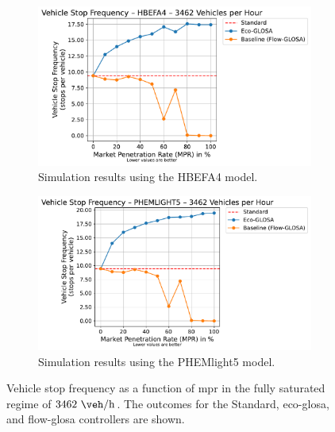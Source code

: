 \begin{figure}[htbp]
  \centering
  \begin{subfigure}[b]{0.98\textwidth}
    \includegraphics[width=\textwidth]{data/img/VehicleStopFrequency/VehicleStopFrequency_HBEFA4_Cars3462.pdf}
    \caption{Simulation results using the HBEFA4 model.}
    \label{fig:StopFreq_3462_HBEFA4}
  \end{subfigure}
  \begin{subfigure}[b]{0.98\textwidth}
    \includegraphics[width=\textwidth]{data/img/VehicleStopFrequency/VehicleStopFrequency_PHEMLIGHT5_Cars3462.pdf}
    \caption{Simulation results using the PHEMlight5 model.}
    \label{fig:StopFreq_3462_PHEM}
  \end{subfigure}
  \caption[Vehicle stop frequency vs. \ac{mpr} at $3462~\unit{\veh\per\hour}$]{Vehicle stop frequency as a function of \ac{mpr} in the fully saturated regime of $3462~\unit{\veh\per\hour}$. The outcomes for the Standard, \ac{eco-glosa}, and \ac{flow-glosa} controllers are shown.}
  \label{fig:StopFreq_3462}
\end{figure}

